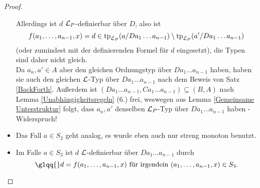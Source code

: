 \begin{proof}
\begin{itemize}
		Allerdings ist $d$ $\mathcal{L}_P$-definierbar über $D$, also ist $$f(a_1,\dots,a_{n-1},x)=d\in\operatorname{tp}_{\mathcal{L}_P}(a/Da_1\dots a_{n-1})\setminus\operatorname{tp}_{\mathcal{L}_P}(a'/Da_1\dots a_{n-1})$$ (oder zumindest mit der definierenden Formel für $d$ eingesetzt), die Typen sind daher nicht gleich.\\
		Da $a_n,a'\in A$ aber den gleichen Ordnungstyp über $Da_1\dots a_{n-1}$ haben, haben sie auch den gleichen $\mathcal{L}$-Typ über $Da_1\dots a_{n-1}$ nach dem Beweis von Satz \ref{BackForth}. Außerdem ist $(Da_1\dots a_{n-1},Ca_1\dots a_{n-1})\subseteq(B,A)$ nach Lemma \ref{Unabhängigkeitsregeln} (6.) frei, weswegen aus Lemma \ref{Gemeinsame Unterstruktur} folgt, dass $a_n,a'$ denselben $\mathcal{L}_P$-Typ über $Da_1\dots a_{n-1}$ haben - Widerspruch!
		\item Das Fall $a\in S_2$ geht analog, es wurde eben auch nur streng monoton benutzt.
		\item Im Falle $a\in S_3$ ist $d$ $\mathcal{L}$-definierbar über $Da_1\dots a_{n-1}$ durch $$\glqq{}d=f(a_1,\dots,a_{n-1},x)\text{ für irgendein }(a_1,\dots,a_{n-1},x)\in S_3.$$
	\end{itemize}
\end{proof}